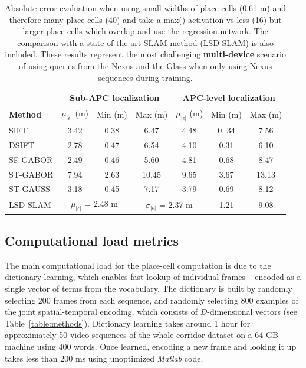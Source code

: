 \begin{table}[h]
\centering
    \begin{tabular}{lcccccc}
    ~		 & \multicolumn{3}{c}{\textbf{Sub-APC localization}} & \multicolumn{3}{c}{\textbf{APC-level localization}} \\ \hline
    \textbf{Method}        & $\mu_{|\epsilon|}$ (m) & Min (m) & Max (m) & $\mu_{|\epsilon|}$ (m) &  Min (m) & Max (m) \\ \hline
    SIFT     & 3.42   & 0.38 & 6.47 & 4.48   & 0. 34 &  7.56\\ \hline
    DSIFT    & 2.78   & 0.47 & 6.54  & 4.10   & 0.31 & 6.10 \\ \hline
    SF-GABOR & 2.49   & 0.46 & 5.60 & 4.81   & 0.68  & 8.47 \\ \hline
    ST-GABOR & 7.94   & 2.63 & 10.45 & 9.65   & 3.67 & 13.13\\ \hline
    ST-GAUSS & 3.18   & 0.45 & 7.17 & 3.79   & 0.69  & 8.12 \\ \hline
    LSD-SLAM & \multicolumn{2}{c}{$\mu_{|\epsilon|}$ = 2.48 m } & \multicolumn{2}{c}{$\sigma_{|\epsilon|}$ = 2.37 m} & 1.21 & 9.08 \\ \hline
    \end{tabular}
    \caption {Absolute error evaluation when using small widths of place cells (0.61 m) and therefore many place cells (40) and take a max() activation vs less (16) but larger place cells which overlap and use the regression network. The comparison with a state of the art SLAM method (LSD-SLAM) is also included. These results represent the most challenging \textbf{multi-device} scenario of using queries from the Nexus and the Glass when only using Nexus sequences during training.}
    \label{table:methodComparison}
\end{table}


\subsection{Computational load metrics}
The main computational load for the place-cell computation is due to the dictionary learning, which enables fast lookup of individual frames -- encoded as a single vector of terms from the vocabulary.  The dictionary is built by randomly selecting 200 frames from each sequence, and randomly selecting 800 examples of the joint spatial-temporal encoding, which consists of $D$-dimensional vectors (see Table~\ref{table:methods}). Dictionary learning takes around 1 hour for approximately 50 video sequences of the whole corridor dataset on a 64 GB machine using 400 words. Once learned, encoding a new frame and looking it up takes less than 200 ms using unoptimized {\it Matlab} code. 

